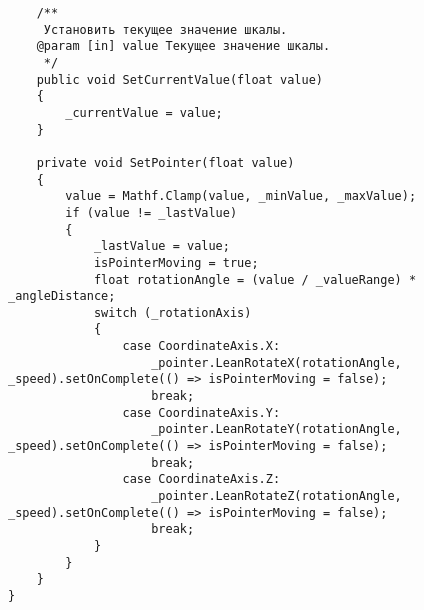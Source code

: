 \begin{verbatim}
    /**
     Установить текущее значение шкалы.
    @param [in] value Текущее значение шкалы.
     */
    public void SetCurrentValue(float value)
    {
        _currentValue = value;
    }

    private void SetPointer(float value)
    {
        value = Mathf.Clamp(value, _minValue, _maxValue);
        if (value != _lastValue)
        {
            _lastValue = value;
            isPointerMoving = true;
            float rotationAngle = (value / _valueRange) * _angleDistance;
            switch (_rotationAxis)
            {
                case CoordinateAxis.X:
                    _pointer.LeanRotateX(rotationAngle, _speed).setOnComplete(() => isPointerMoving = false);
                    break;
                case CoordinateAxis.Y:
                    _pointer.LeanRotateY(rotationAngle, _speed).setOnComplete(() => isPointerMoving = false);
                    break;
                case CoordinateAxis.Z:
                    _pointer.LeanRotateZ(rotationAngle, _speed).setOnComplete(() => isPointerMoving = false);
                    break;
            }
        }
    }
}

\end{verbatim}
